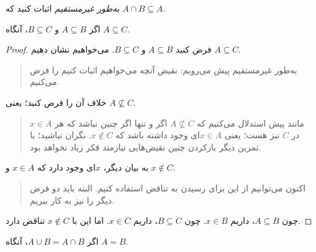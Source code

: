 \documentclass[../../../include/open-logic-section]{subfiles}
\begin{document}
\begin{prob}
\emph{به‌طور غیرمستقیم} اثبات کنید که $A \cap B \subseteq A$.
\end{prob}

\begin{prop}
اگر $A \subseteq B$ و $B \subseteq C$، آنگاه $A \subseteq C$.
\end{prop}

\begin{proof}
  فرض کنید $A \subseteq B$ و $B \subseteq C$. می‌خواهیم نشان دهیم
  $A \subseteq C$.
  \begin{quote}
    به‌طور غیرمستقیم پیش می‌رویم: نقیض آنچه می‌خواهیم اثبات کنیم را
    فرض می‌کنیم.
  \end{quote}
  خلاف آن را فرض کنید؛ یعنی $A \nsubseteq C$.
  \begin{quote}
    مانند پیش استدلال می‌کنیم که $A \nsubseteq C$ اگر و تنها اگر چنین
    نباشد که هر $x \in A$ در $C$ نیز هست؛ یعنی $x \in A$ای وجود داشته
    باشد که $x \notin C$. نگران نباشید؛ با تمرین دیگر بازکردن چنین
    نقیض‌هایی نیازمند فکر زیاد نخواهد بود.
  \end{quote}
  به بیان دیگر، $x$ای وجود دارد که $x \in A$ و $x \notin C$.
  \begin{quote}
    اکنون می‌توانیم از این برای رسیدن به تناقض استفاده کنیم. البته باید
    دو فرض دیگر را نیز به کار ببریم.
  \end{quote}
  چون $A \subseteq B$، داریم $x \in B$. چون $B \subseteq C$، داریم
  $x \in C$. اما این با $x \notin C$ تناقض دارد.
\end{proof}

\begin{prop}
اگر $A \cup B = A \cap B$، آنگاه $A = B$.
\end{prop}
\end{document}
